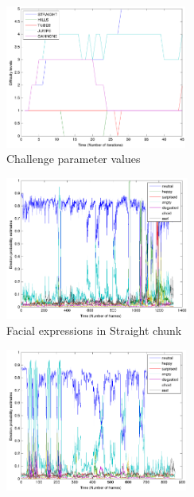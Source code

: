\documentclass[letterpaper]{article}
\begin{document}
\begin{figure}[t]
        \centering
        \begin{subfigure}[t]{0.32\textwidth}
								\centering
                \includegraphics[height=4.7cm,keepaspectratio]{images/paris/difficulties.png}
                \caption{Challenge parameter values}
								\label{fig:sectionDifficultiesEmotions}
        \end{subfigure}%
				\quad
        \begin{subfigure}[t]{0.32\textwidth}
								\centering
                \includegraphics[height=4.7cm,keepaspectratio]{images/paris/sectionStraightEmotions.png}
                \caption{Facial expressions in Straight chunk}
								\label{fig:sectionStraightEmotions}
        \end{subfigure}%
				\quad
        \begin{subfigure}[t]{0.32\textwidth}
								\centering
                \includegraphics[height=4.7cm,keepaspectratio]{images/paris/sectionHillsEmotions.png}

\end{subfigure}
\end{figure}
\end{document}
